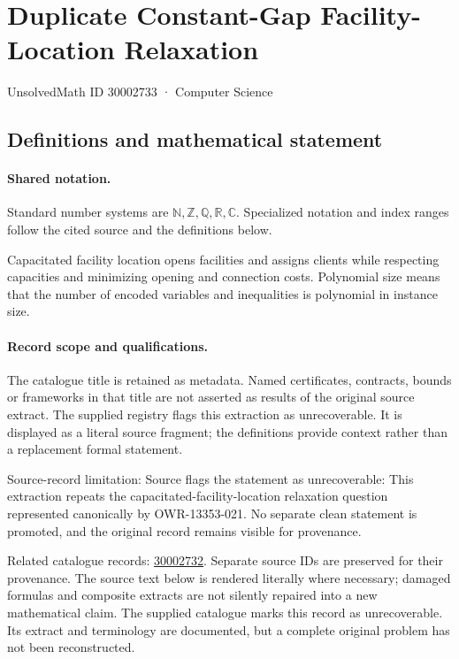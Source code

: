 \documentclass[11pt]{article}
\begin{document}
\setcounter{section}{30002732}
\section{Duplicate Constant-Gap Facility-Location Relaxation}\label{30002733}
{\small\sffamily UnsolvedMath ID 30002733 · Computer Science}
\subsection{Definitions and mathematical statement}

\paragraph{Shared notation.}Standard number systems are $\mathbb N,\mathbb Z,\mathbb Q,\mathbb R,\mathbb C$. Specialized notation and index ranges follow the cited source and the definitions below.


Capacitated facility location opens facilities and assigns clients while respecting capacities and minimizing opening and connection costs. Polynomial size means that the number of encoded variables and inequalities is polynomial in instance size.
\paragraph{Record scope and qualifications.}
The catalogue title is retained as metadata. Named certificates, contracts, bounds or frameworks in that title are not asserted as results of the original source extract.
The supplied registry flags this extraction as unrecoverable. It is displayed as a literal source fragment; the definitions provide context rather than a replacement formal statement.

Source-record limitation: Source flags the statement as unrecoverable: This extraction repeats the capacitated-facility-location relaxation question represented canonically by OWR-13353-021. No separate clean statement is promoted, and the original record remains visible for provenance.

Related catalogue records: \href{https://mehmetmars7.github.io/Erdosproblems-llm-hunter/problem.html?type=open_problems&id=30002732}{30002732}. Separate source IDs are preserved for their provenance.
The source text below is rendered literally where necessary; damaged formulas and composite extracts are not silently repaired into a new mathematical claim.
The supplied catalogue marks this record as unrecoverable. Its extract and terminology are documented, but a complete original problem has not been reconstructed.
\end{document}
